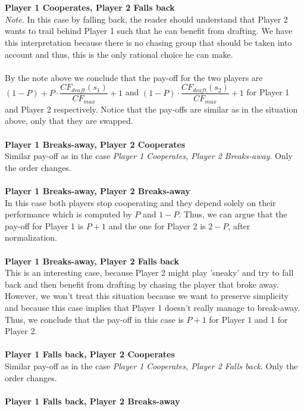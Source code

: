 \documentclass[10pt, a4paper]{report}
\begin{document}
\\\\
\textbf{Player 1 Cooperates, Player 2 Falls back}
\\
\textit{Note.} In this case by falling back, the reader should understand that Player 2 wants to trail behind Player 1 such that he can benefit from drafting. We have this interpretation because there is no chasing group that should be taken into account and thus, this is the only rational choice he can make.
\\\\
By the note above we conclude that the pay-off for the two players are $(1-P) +  P\cdot \dfrac{CF_{draft}(s_1)}{CF_{max}} + 1$ and $(1-P)\cdot \dfrac{CF_{draft}(s_2)}{CF_{max}} + 1$ for Player 1 and Player 2 respectively. Notice that the pay-offs are similar as in the situation above, only that they are swapped.
\\\\
\textbf{Player 1 Breaks-away, Player 2 Cooperates}
\\
Similar pay-off as in the case \textit{Player 1 Cooperates, Player 2 Breaks-away}. Only the order changes.
\\\\
\textbf{Player 1 Breaks-away, Player 2 Breaks-away}
\\
In this case both players stop cooperating and they depend solely on their performance which is computed by $P$ and $1-P$. Thus, we can argue that the pay-off for Player 1 is $P+1$ and the one for Player 2 is $2-P$, after normalization.
\\\\
\textbf{Player 1 Breaks-away, Player 2 Falls back}
\\
This is an interesting case, because Player 2 might play 'sneaky' and try to fall back and then benefit from drafting by chasing the player that broke away. However, we won't treat this situation because we want to preserve simplicity and because this case implies that Player 1 doesn't really manage to break-away. Thus, we conclude that the pay-off in this case is $P+1$ for Player 1 and 1 for Player 2.
\\\\
\textbf{Player 1 Falls back, Player 2 Cooperates}
\\
Similar pay-off as in the case \textit{Player 1 Cooperates, Player 2 Falls back}. Only the order changes.
\\\\
\textbf{Player 1 Falls back, Player 2 Breaks-away}
\\
\end{document}
